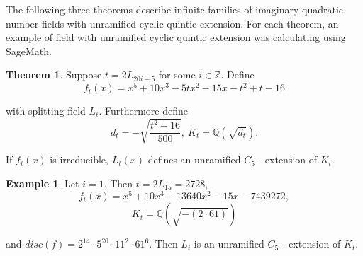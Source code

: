 \documentclass[12pt]{extarticle}
\newcommand{\Q}{\mathbb{Q}}
\newcommand{\Z}{\mathbb{Z}}
\newcommand{\<}{\langle}
\renewcommand{\>}{\rangle}
\theoremstyle{definition}
\newtheorem{theorem}{Theorem}
\newtheorem{example}{Example}
\begin{document}
The following three theorems describe infinite families of imaginary quadratic number fields with unramified cyclic quintic extension. For each theorem, an example of field with unramified cyclic quintic extension was calculating using SageMath. 
\begin{theorem}
Suppose $t = 2L_{20i-5}$ for some $i \in \Z$. Define 
\begin{equation}
f_t(x) = x^5 + 10x^3 - 5tx^2-15x-t^2+t-16
\end{equation}
 


with splitting field $L_t$. 
Furthermore define 
\begin{equation}
d_t = -\sqrt{\frac{t^2+16}{500}},\:K_t = \Q(\sqrt{d_t}).
\end{equation}

If $f_t(x)$ is irreducible, $L_t(x)$ defines an unramified $C_5$ - extension of $K_t$. 
\end{theorem}
\begin{example}
Let $i=1$. Then $t=2L_{15} = 2728$,
\begin{equation}
f_t(x) = x^5 + 10x^3 - 13640x^2 - 15x - 7439272,
\end{equation}
\begin{equation}
 K_t = \Q\left(\sqrt{-(2 \cdot 61)}\right)
\end{equation}

 and $disc(f) = 2^{14} \cdot 5^{20} \cdot 11^2 \cdot 61^6$. Then $L_t$ is an unramified $C_5$ - extension of $K_t$. 
\end{example}
\end{document}
